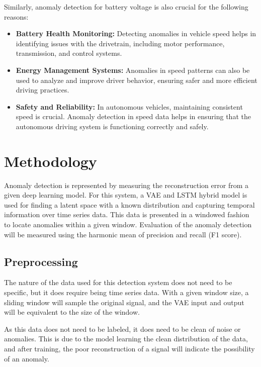 \documentclass[conference]{IEEEtran}
\begin{document}
Similarly, anomaly detection for battery voltage is also crucial for the following reasons:
\begin{itemize}
    \item \textbf{Battery Health Monitoring:} Detecting anomalies in vehicle speed helps in identifying issues with the drivetrain, including motor performance, transmission, and control systems.
    \item \textbf{Energy Management Systems:} Anomalies in speed patterns can also be used to analyze and improve driver behavior, ensuring safer and more efficient driving practices.
    \item \textbf{Safety and Reliability:} In autonomous vehicles, maintaining consistent speed is crucial. Anomaly detection in speed data helps in ensuring that the autonomous driving system is functioning correctly and safely.
\end{itemize}

\section{Methodology}
Anomaly detection is represented by measuring the reconstruction error from a given deep learning model. For this system, a VAE and LSTM hybrid model is used for finding a latent space with a known distribution and capturing temporal information over time series data. This data is presented in a windowed fashion to locate anomalies within a given window. Evaluation of the anomaly detection will be measured using the harmonic mean of precision and recall (F1 score).

\subsection{Preprocessing}
The nature of the data used for this detection system does not need to be specific, but it does require being time series data. With a given window size, a sliding window will sample the original signal, and the VAE input and output will be equivalent to the size of the window. 

As this data does not need to be labeled, it does need to be clean of noise or anomalies. This is due to the model learning the clean distribution of the data, and after training, the poor reconstruction of a signal will indicate the possibility of an anomaly.
\end{document}
